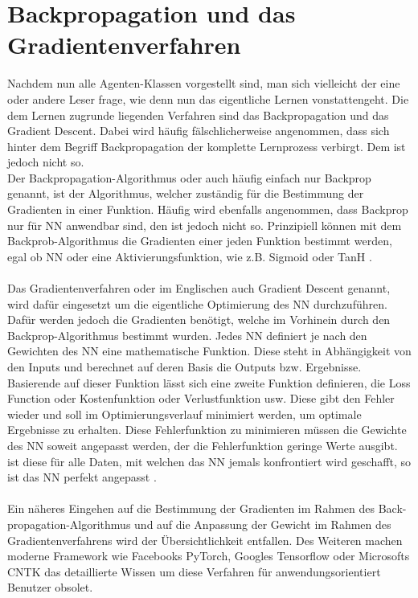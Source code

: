 \section{Backpropagation und das Gradientenverfahren} \label{Backprop_GD}
Nachdem nun alle Agenten-Klassen vorgestellt sind, man sich vielleicht der eine oder andere Leser frage, wie denn nun das eigentliche Lernen vonstattengeht. Die dem Lernen zugrunde liegenden Verfahren sind das Backpropagation und das Gradient Descent. Dabei wird häufig fälschlicherweise angenommen, dass sich hinter dem Begriff Backpropagation der komplette Lernprozess verbirgt. Dem ist jedoch nicht so.\\
Der Backpropagation-Algorithmus oder auch häufig einfach nur Backprop genannt, ist der Algorithmus, welcher zuständig für die Bestimmung der Gradienten in einer Funktion. Häufig wird ebenfalls angenommen, dass Backprop nur für NN anwendbar sind, den ist jedoch nicht so. Prinzipiell können mit dem Backprob-Algorithmus die Gradienten einer jeden Funktion bestimmt werden, egal ob NN oder eine Aktivierungsfunktion, wie z.B. Sigmoid oder TanH \cite[S. 90ff.]{DL}.\\
\\Das Gradientenverfahren oder im Englischen auch Gradient Descent genannt, wird dafür eingesetzt um die eigentliche Optimierung des NN durchzuführen. Dafür werden jedoch die Gradienten benötigt, welche im Vorhinein durch den Backprop-Algorithmus bestimmt wurden. Jedes NN definiert je nach den Gewichten des NN eine mathematische Funktion. Diese steht in Abhängigkeit von den Inputs und berechnet auf deren Basis die Outputs bzw. Ergebnisse. Basierende auf dieser Funktion lässt sich eine zweite Funktion definieren, die Loss Function oder Kostenfunktion oder Verlustfunktion usw. Diese gibt den Fehler wieder und soll im Optimierungsverlauf minimiert werden, um optimale Ergebnisse zu erhalten. Diese Fehlerfunktion zu minimieren müssen die Gewichte des NN soweit angepasst werden, der die Fehlerfunktion geringe Werte ausgibt. ist diese für alle Daten, mit welchen das NN jemals konfrontiert wird geschafft, so ist das NN perfekt angepasst \cite[S. 225ff.]{DL}.\\
\\Ein näheres Eingehen auf die Bestimmung der Gradienten im Rahmen des Back-propagation-Algorithmus und auf die Anpassung der Gewicht im Rahmen des Gradientenverfahrens wird der Übersichtlichkeit entfallen. Des Weiteren machen moderne Framework wie Facebooks PyTorch, Googles Tensorflow oder Microsofts CNTK das detaillierte Wissen um diese Verfahren für anwendungsorientiert Benutzer obsolet.